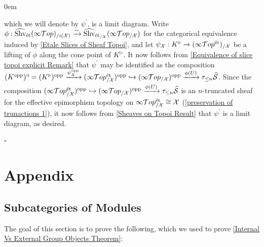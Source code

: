 \documentclass[10pt]{article}
\newcommand{\mS}{\mathcal S}
\newcommand{\cT}{\mathcal{T}}
\newcommand{\cX}{\mathcal{X}}
\renewcommand{\qed}{\hfill$\square$}
\renewenvironment{proof}{\begin{addmargin}[1em]{0em}\begin{newproof}}{\end{newproof}\end{addmargin}\qed}
\theoremstyle{witharg}
\theoremstyle{witharg}
\theoremstyle{witharg2}
\begin{document}
\begin{proof}
\noindent which we will denote by $\psi^\prime$, is a limit diagram. Write $\phi:\widehat{\textnormal{Shv}}_{\textnormal{\'{e}t}}(\infty\cT op)_{/i(\cX)}\xrightarrow{\sim}\widehat{\textnormal{Shv}}_{\textnormal{\'{e}t}_{/\cX}}(\infty\cT op_{/\cX})$ for the categorical equivalence induced by \ref{Etale Slices of Sheaf Topoi}, and let $\psi_\cX:K^\triangleright\rightarrow (\infty\cT op^{\textnormal{\'{e}t}})_{/\cX}$ be a lifting of $\phi$ along the cone point of $K^\triangleright$. It now follows from \ref{Equivalence of slice topoi explicit Remark} that $\psi^\prime$ may be identified as the composition $(K^{\textnormal{opp}})^\triangleleft=(K^\triangleright)^{\textnormal{opp}}\xrightarrow{\psi_X^{\textnormal{opp}}}(\infty\cT op^{\textnormal{\'{e}t}}_{/\cX})^\textnormal{opp}\hookrightarrow (\infty\cT op_{/\cX})^\textnormal{opp}\xrightarrow{\phi(U)}\tau_{\leq n}\widehat{\mS}$. Since the composition $(\infty\cT op^{\textnormal{\'{e}t}}_{/\cX})^\textnormal{opp}\hookrightarrow (\infty\cT op_{/\cX})^\textnormal{opp}\xrightarrow{\phi(U)}\tau_{\leq n}\widehat{\mS}$ is an $n$-truncated sheaf for the effective epimorphism topology on $\infty\cT op^{\textnormal{\'{e}t}}_{/\cX}\cong \cX$ (\ref{preservation of trunactions 1}), it now follows from \ref{Sheaves on Topoi Result} that $\psi^\prime$ is a limit diagram, as desired. 



    
\end{proof}



\newpage




\section{Appendix}\label{Appendix}






\subsection{Subcategories of Modules}\label{Subcategories of Modules}

\noindent The goal of this section is to prove the following, which we used to prove \ref{Internal Vs External Group Objects Theorem}:
\end{document}
